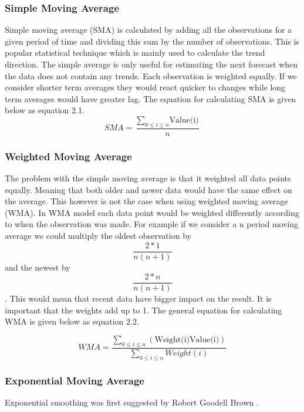 \subsubsection{Simple Moving Average}
Simple moving average (SMA) is calculated by adding all the observations for a given period of time and dividing this sum by the number of observations. This is popular statistical technique which is mainly used to calculate the trend direction. The simple average is only useful for estimating the next forecast when the data does not contain any trends. Each observation is weighted equally. If we consider shorter term averages they would react quicker to changes while long term averages would have greater lag. The equation for calculating SMA is given below as equation 2.1.\\

\begin{equation}\label{sma}
	SMA = \frac{\sum_{0\le i\le n}\textrm{Value(i)}}{n}
\end{equation}

\subsubsection{Weighted Moving Average}
The problem with the simple moving average is that it weighted all data points equally. Meaning that both older and newer data would have the same effect on the average. This however is not the case when using weighted moving average (WMA). In WMA model each data point would be weighted differently according to when the observation was made. For example if we consider a n period moving average we could multiply the oldest observation by \[\frac{2*1}{n(n+1)}\] and the newest by \[\frac{2*n}{n(n+1)}\]. This would mean that recent data have bigger impact on the result. It is important that the weights add up to 1. The general equation for calculating WMA is given below as equation 2.2.

\begin{equation}\label{wma}
WMA = \frac{\sum_{0\le i\le n}(\textrm{Weight(i)}\textrm{Value(i)})}{\sum_{0\le i\le n}Weight(i)}
\end{equation}

\subsubsection{Exponential Moving Average}
Exponential smoothing was first suggested by Robert Goodell Brown \cite{FOR3980040103}. 

